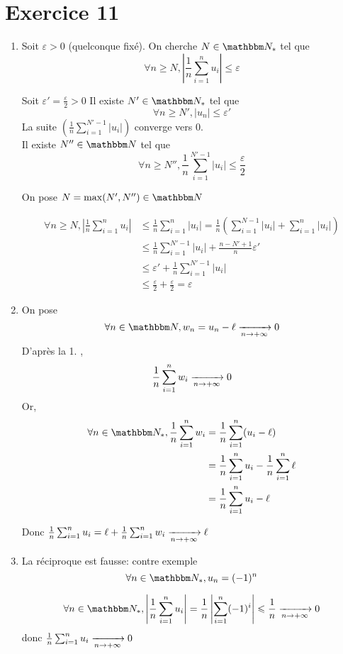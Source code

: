 \part{Exercice 11}

\begin{enumerate}
\item Soit $\varepsilon>0$ (quelconque fixé). On cherche $N \in \N_*$ tel que \[
\forall n \ge N, \left| \frac{1}{n} \sum_{i=1}^{n} u_i \right| \le \varepsilon
\]

Soit $\varepsilon' = \frac{\varepsilon}{2}>0$ Il existe $N' \in \N_*$ tel que \[
\forall n \ge N', \left| u_n \right| \le \varepsilon'
\] 
La suite $\left( \frac{1}{n}\sum_{i=1}^{N' -1}  \left| u_i \right|\right)$ converge vers 0.\\

Il existe $N'' \in \N$ tel que \[
\forall n \ge N'', \frac{1}{n}\sum_{i=1}^{N'-1} \left| u_i \right| \le \frac{\varepsilon}{2}
\] 

On pose $N = \max(N', N'') \in \N$

\begin{align*}
	\forall n \ge N,
	\left| \frac{1}{n}\sum_{i=1}^{n} u_i \right| &\le \frac{1}{n}\sum_{i = 1}^{n} \left| u_i \right| = \frac{1}{n}\left( \sum_{i=1}^{N-1} \left| u_i \right| + \sum_{i=1}^{n} \left| u_i \right| \right) \\
	&\le \frac{1}{n} \sum_{i=1}^{N'-1} \left| u_i \right| + \frac{n-N'+1}{n}\varepsilon'  \\
	&\le \varepsilon' + \frac{1}{n} \sum_{i=1}^{N' -1} \left| u_i \right| \\
	&\le \frac{\varepsilon}{2} + \frac{\varepsilon}{2} = \varepsilon
\end{align*}
\item
On pose \[
\forall n \in \N, w_n = u_n - \ell \tendsto{n\to +\infty} 0
\] D'après la 1. , \[
\frac{1}{n} \sum_{i=1}^{n} w_i \xrightarrow[n \to +\infty]{} 0
\] 
Or,
\begin{align*}
	\forall n \in \N_*, \frac{1}{n} \sum_{i=1}^{n} w_i &= \frac{1}{n} \sum_{i=1}^{n} (u_i - \ell) \\
	&= \frac{1}{n} \sum_{i=1}^{n} u_i - \frac{1}{n}\sum_{i=1}^{n} \ell \\
	&= \frac{1}{n}\sum_{i=1}^{n} u_i - \ell \\
\end{align*}

Donc $\frac{1}{n} \sum_{i=1}^{n} u_i = \ell + \frac{1}{n}\sum_{i=1}^{n} w_i \xrightarrow[n \to +\infty]{} \ell$ 

\item
La réciproque est fausse: contre exemple \[
\forall n \in \N_*, u_n = (-1)^n
\] 

\[
\forall n \in \N_*, \left| \frac{1}{n} \sum_{i=1}^{n} u_i \right| = \frac{1}{n}\left| \sum_{i=1}^{n} (-1)^i \right| \le \frac{1}{n} \tendsto{n \to +\infty} 0
\] 
donc $\frac{1}{n}\sum_{i=1}^{n} u_i \xrightarrow[n \to +\infty]{} 0$
\end{enumerate}
